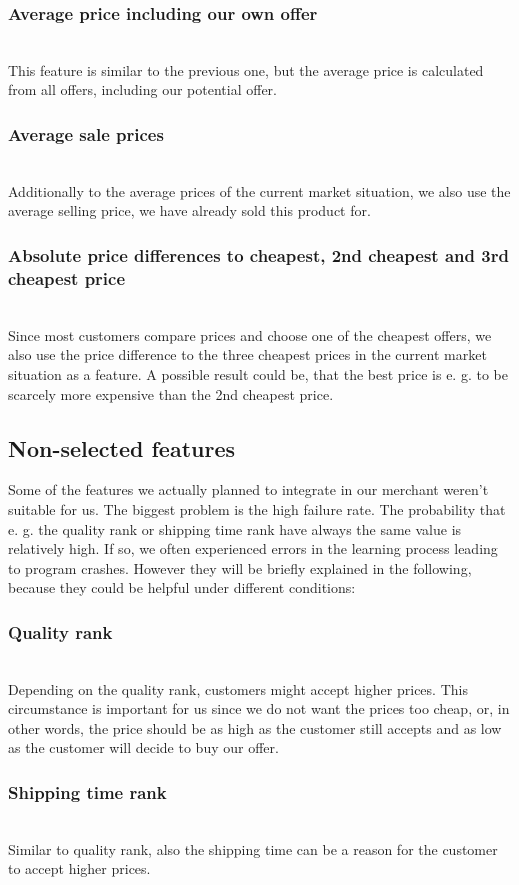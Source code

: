 	\subsubsection{Average price including our own offer}
		~\\
		This feature is similar to the previous one, but the average price is calculated from all offers, including our potential offer.
	\subsubsection{Average sale prices}
		~\\
		Additionally to the average prices of the current market situation, we also use the average selling price, we have already sold this product for.
	\subsubsection{Absolute price differences to cheapest, 2nd cheapest and 3rd cheapest price}
		~\\
		Since most customers compare prices and choose one of the cheapest offers, we also use the price difference to the three cheapest prices in the current market situation as a feature. A possible result could be, that the best price is e. g. to be scarcely more expensive than the 2nd cheapest price.
\subsection{Non-selected features}
	Some of the features we actually planned to integrate in our merchant weren't suitable for us. The biggest problem is the high failure rate. The probability that e. g. the quality rank or shipping time rank have always the same value is relatively high. If so, we often experienced errors in the learning process leading to program crashes. However they will be briefly explained in the following, because they could be helpful under different conditions:
	\subsubsection{Quality rank}
		~\\
		Depending on the quality rank, customers might accept higher prices. This circumstance is important for us since we do not want the prices too cheap, or, in other words, the price should be as high as the customer still accepts and as low as the customer will decide to buy our offer.
	\subsubsection{Shipping time rank}
		~\\
		Similar to quality rank, also the shipping time can be a reason for the customer to accept higher prices.
